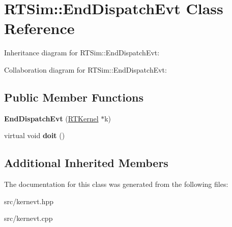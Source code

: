 \hypertarget{classRTSim_1_1EndDispatchEvt}{}\section{R\+T\+Sim\+:\+:End\+Dispatch\+Evt Class Reference}
\label{classRTSim_1_1EndDispatchEvt}


Inheritance diagram for R\+T\+Sim\+:\+:End\+Dispatch\+Evt\+:


Collaboration diagram for R\+T\+Sim\+:\+:End\+Dispatch\+Evt\+:
\subsection*{Public Member Functions}
\begin{DoxyCompactItemize}
\item 
{\bfseries End\+Dispatch\+Evt} (\hyperlink{classRTSim_1_1RTKernel}{R\+T\+Kernel} $\ast$k)\hypertarget{classRTSim_1_1EndDispatchEvt_a3dbfb8273ff9602bd730cd5793856145}{}\label{classRTSim_1_1EndDispatchEvt_a3dbfb8273ff9602bd730cd5793856145}

\item 
virtual void {\bfseries doit} ()\hypertarget{classRTSim_1_1EndDispatchEvt_a1637663bb20bfd6b9e11360532fbb659}{}\label{classRTSim_1_1EndDispatchEvt_a1637663bb20bfd6b9e11360532fbb659}

\end{DoxyCompactItemize}
\subsection*{Additional Inherited Members}


The documentation for this class was generated from the following files\+:\begin{DoxyCompactItemize}
\item 
src/kernevt.\+hpp\item 
src/kernevt.\+cpp\end{DoxyCompactItemize}

